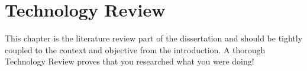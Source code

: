 \chapter{Technology Review}
This chapter is the literature review part of the dissertation and should be tightly coupled to the context and objective from the introduction.
A thorough Technology Review proves that you researched what you were doing!
